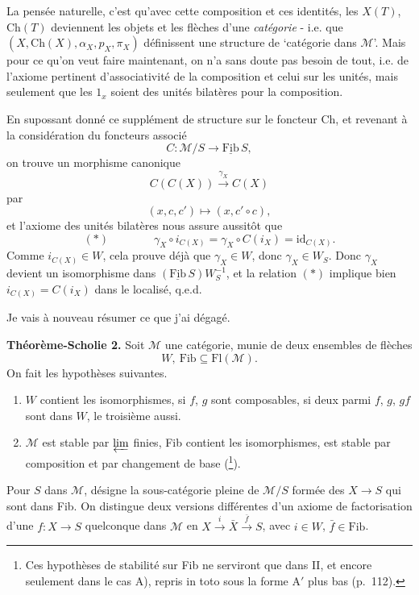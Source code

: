\documentclass[11pt]{article}
\newcommand{\printedpage}[1]{\marginpar{\footnotesize p.~#1}}
\newcommand{\msp}[1]{\marginpar{\footnotesize [#1]}}
\newcommand{\Fib}{\underline{\mathrm{Fib}}}
\newcommand{\Ch}{\mathrm{Ch}}
\begin{document}
\printedpage{67}

La pensée naturelle, c'est qu'avec cette composition et ces identités, les $X(T)$, $\Ch(T)$ deviennent les objets et les flèches d'une \textit{catégorie} - i.e. que $(X,\Ch(X),\alpha_X,p_X,\pi_X)$ définissent une structure de ‘catégorie dans $\mathcal{M}$’. Mais pour ce qu'on veut faire maintenant, on n'a sans doute pas besoin de tout, i.e.
\msp{page 107}
de l'axiome pertinent d'associativité de la composition et celui sur les unités, mais seulement que les $1_x$ soient des unités bilatères pour la composition.

En supossant donné ce supplément de structure sur le foncteur Ch, et revenant à la considération du foncteurs associé %
\[
C : \mathcal{M}/S\longrightarrow\Fib\,S,
\]
on trouve un morphisme canonique
\[
C(C(X))\xrightarrow{\gamma_X}C(X)
\]
par
\[
(x,c,c')\longmapsto(x,c'\circ c),
\]
et l'axiome des unités bilatères nous assure aussitôt que
\[
(\ast)\qquad\qquad\gamma_X\circ i_{C(X)}=\gamma_X\circ C(i_X)=\mathrm{id}_{C(X)}.
\]
Comme $i_{C(X)}\in W$, cela prouve déjà que $\gamma_X\in W$, donc $\gamma_X\in W_S$. Donc $\gamma_X$ devient un isomorphisme dans $(\Fib\,S)W_S^{-1}$, et la relation $(\ast)$ implique bien $i_{C(X)}=C(i_X)$ dans le localisé, q.e.d.

Je vais à nouveau résumer ce que j'ai dégagé.

\msp{page 108}
\textbf{Théorème-Scholie 2.} Soit $\mathcal{M}$ une catégorie, munie de deux ensembles de flèches
\[
W,\ \mathrm{Fib}\subseteq\mathrm{Fl}(\mathcal{M}).
\]
On fait les hypothèses suivantes.

\begin{enumerate}[label={}]
\item[$1^o$] $W$ contient les isomorphismes, si $f$, $g$ sont composables, si deux parmi $f$, $g$, $gf$ sont dans $W$, le troisième aussi.
\item[$2^o$] $\mathcal{M}$ est stable par $\varprojlim$ finies, Fib contient les isomorphismes, est stable par composition et par changement de base (\footnote[59]{Ces hypothèses de stabilité sur Fib ne serviront que dans II, et encore seulement dans le cas A), repris in toto sous la forme A$'$ plus bas (p.~112).}).
\end{enumerate}

Pour $S$ dans $\mathcal{M}$, \fbox{$\Fib\,S$} désigne la sous-catégorie pleine de $\mathcal{M}/S$ formée des $X\longrightarrow S$ qui sont dans Fib. On distingue deux versions différentes d'un axiome de factorisation d'une $f : X\longrightarrow S$ quelconque dans $\mathcal{M}$ en $X\xrightarrow{i}\bar X\xrightarrow{\bar f}S$, avec $i\in W$, $\bar f\in\mathrm{Fib}$.
\end{document}
